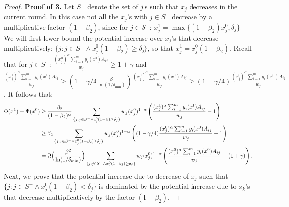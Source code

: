 \documentclass[11pt]{article}
\begin{document}
\begin{proof}
\noindent\textbf{Proof of 3.} Let $S^-$ denote the set of $j$'s such that $x_j$ decreases in the current round. In this case not all the $x_j$'s with $j\in S^-$ decrease by a multiplicative factor $(1-\beta_2)$, since for $j\in S^-$: $x_j^1 = \max\{(1-\beta_2)x_j^0, \delta_j\}$. We will first lower-bound the potential increase over $x_j$'s that decrease multiplicatively: $\{j: j\in S^- \wedge x_j^0(1-\beta_2)\geq \delta_j\}$, so that $x_j^1 = x_j^0(1-\beta_2)$. Recall that for $j\in S^-$: $\frac{(x_j^0)^{\alpha}\sum_{i=1}^my_i(x^0)A_{ij}}{w_j}\geq 1+ \gamma$ and $\frac{(x_j^1)^{\alpha}\sum_{i=1}^my_i(x^1)A_{ij}}{w_j} \geq (1-\gamma/4\frac{\beta}{\ln(1/\delta_{\min})})\frac{(x_j^0)^{\alpha}\sum_{i=1}^my_i(x^0)A_{ij}}{w_j}\geq(1-\gamma/4)\frac{(x_j^0)^{\alpha}\sum_{i=1}^my_i(x^0)A_{ij}}{w_j}$. It follows that:
\begin{align}
\Phi(x^1) - \Phi(x^0) &\geq \frac{\beta_2}{(1-\beta_2)^{\alpha}}\sum_{\{j: j\in S^- \wedge x_j^0(1-\beta)\geq \delta_j\}} w_j (x_j^0)^{1-\alpha}\left(\frac{(x_j^1)^{\alpha}\sum_{i=1}^my_i(x^1)A_{ij}}{w_j} - 1\right)\notag\\
&\geq {\beta_2}\sum_{\{j: j\in S^- \wedge x_j^0(1-\beta_2)\geq \delta_j\}} w_j (x_j^0)^{1-\alpha}\left((1-\gamma/4)\frac{(x_j^0)^{\alpha}\sum_{i=1}^my_i(x^0)A_{ij}}{w_j}- 1\right)\notag\\
&=\Omega\Big(\frac{\beta^2}{\ln(1/\delta_{\min})}\Big)\sum_{\{j: j\in S^- \wedge x_j^0(1-\beta_2)\geq \delta_j\}} w_j (x_j^0)^{1-\alpha}\left(\frac{(x_j^0)^{\alpha}\sum_{i=1}^my_i(x^0)A_{ij}}{w_j}- (1+\gamma)\right).\label{eq:pot-increase-bound-multiplicative}
\end{align}
Next, we prove that the potential increase due to decrease of $x_j$ such that $\{j: j\in S^- \wedge x_j^0(1-\beta_2)< \delta_j\}$ is dominated by the potential increase due to $x_k$'s that decrease multiplicatively by the factor $(1-\beta_2)$. 


\end{proof}
\end{document}
